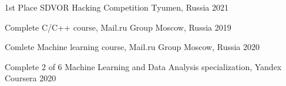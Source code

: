 \begin{cvhonors}

  \cvhonor
    {1st Place} %
    {SDVOR Hacking Competition} %
    {Tyumen, Russia} %
    {2021} %

  \cvhonor
    {Complete} %
    {C/C++ course, Mail.ru Group} %
    {Moscow, Russia} %
    {2019} %

  \cvhonor
    {Comlete} %
    {Machine learning course, Mail.ru Group} %
    {Moscow, Russia} %
    {2020} %

  \cvhonor
    {Complete 2 of 6} %
    {Machine Learning and Data Analysis specialization, Yandex} %
    {Coursera} %
    {2020} %


\end{cvhonors}

